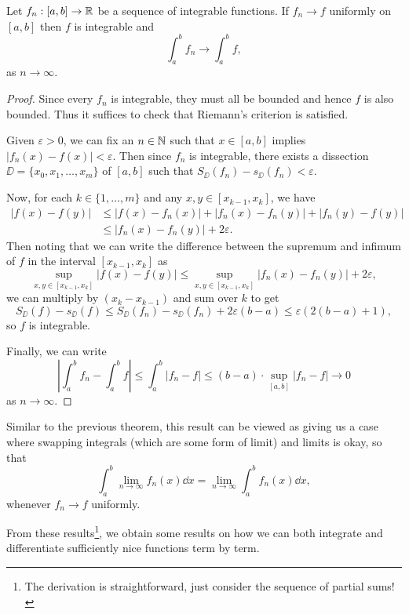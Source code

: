 \documentclass[a4paper]{scrartcl}
\begin{document}
\begin{theorem}\label{thm3}
Let $f_n: [a, b] \rightarrow \mathbb{R}$ be a sequence of integrable functions. If $f_n \rightarrow f$ uniformly on $[a, b]$ then $f$ is integrable and
$$
\int_a^b f_n \rightarrow \int_a^b f,
$$
as $n \rightarrow \infty$.
\end{theorem}
\begin{proof}
    Since every $f_n$ is integrable, they must all be bounded and hence $f$ is also bounded. Thus it suffices to check that Riemann's criterion is satisfied.

    Given $\varepsilon > 0$, we can fix an $n \in \mathbb{N}$ such that $x \in [a, b]$ implies $|f_n(x) - f(x)| < \varepsilon$. Then since $f_n$ is integrable, there exists a dissection $\DD = \{x_0, x_1, \dots, x_m\}$ of $[a, b]$ such that $S_{\DD}(f_n) - s_{\DD}(f_n) < \varepsilon$. 

    Now, for each $k \in \{1, \dots, m\}$ and any $x,y \in[x_{k - 1}, x_k]$, we have
    \begin{align*}
        |f(x) - f(y)| &\leq |f(x) - f_n(x)| + |f_n(x) - f_n(y)| + |f_n(y) - f(y)| \\
        &\leq |f_n(x) - f_n(y)| + 2 \varepsilon.
    \end{align*}
    Then noting that we can write the difference between the supremum and infimum of $f$ in the interval $[x_{k - 1}, x_k]$ as
    $$
        \sup_{x, y \in [x_{k - 1}, x_k]} |f(x) - f(y)| \leq \sup_{x, y \in [x_{k - 1}, x_k]} |f_n(x) - f_n(y)| + 2 \varepsilon,
    $$
    we can multiply by $(x_k - x_{k - 1})$ and sum over $k$ to get 
    $$ 
    S_{\DD}(f) - s_{\DD}(f) \leq S_{\DD}(f_n) - s_{\DD}(f_n) + 2 \varepsilon (b - a) \leq \varepsilon (2(b - a) + 1),
    $$
    so $f$ is integrable.

    Finally, we can write
    $$
    \left|\int_a^b f_n - \int_a^b f\right| \leq \int_a^b |f_n - f| \leq (b - a) \cdot \sup_{[a, b]} |f_n - f| \rightarrow 0
    $$
    as $n \rightarrow \infty$.
\end{proof}

Similar to the previous theorem, this result can be viewed as giving us a case where swapping integrals (which are some form of limit) and limits is okay, so that
$$
    \int_a^b \lim_{n \to \infty} f_n(x) \dd x = \lim_{n \to \infty} \int_a^b f_n(x) \dd x,
$$
whenever $f_n \rightarrow f$ uniformly.


From these results\footnote{The derivation is straightforward, just consider the sequence of partial sums!}, we obtain some results on how we can both integrate and differentiate sufficiently nice functions term by term.
\end{document}
